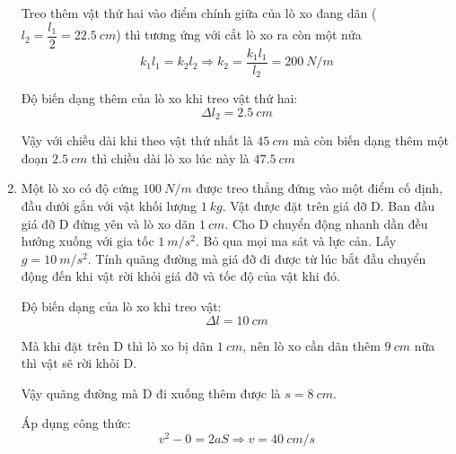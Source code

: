 \begin{enumerate}[label=\bfseries Câu \arabic*:]
{		Treo thêm vật thứ hai vào điểm chính giữa của lò xo đang dãn ($l_2 = \dfrac{l_1}{2} = \SI{22.5}{cm}$) thì tương ứng với cắt lò xo ra còn một nửa 
		$$k_1l_1= k_2 l_2 \Rightarrow k_2 = \dfrac{k_1l_1}{l_2} = \SI{200}{N/m}$$
		
		Độ biến dạng thêm của lò xo khi treo vật thứ hai:
		$$\Delta l_2 = \SI{2.5}{cm}$$
		
		Vậy với chiều dài khi theo vật thứ nhất là $\SI{45}{cm}$ mà còn biến dạng thêm một đoạn $\SI{2.5}{cm}$ thì chiều dài lò xo lúc này là $\SI{47.5}{cm}$
		
	}
	\item {}
	
	
	{
		Một lò xo có độ cứng $\SI{100}{N/m}$ được treo thẳng đứng vào một điểm cố định, đầu dưới gắn với vật khối lượng $\SI{1}{kg}$. Vật được đặt trên giá đỡ D. Ban đầu giá đỡ D đứng yên và lò xo dãn $\SI{1}{cm}$. Cho D chuyển động nhanh dần đều hướng xuống với gia tốc $\SI{1}{m/s^2}$. Bỏ qua mọi ma sát và lực cản. Lấy $g=\SI{10}{m/s^2}$. Tính quãng đường mà giá đỡ đi được từ lúc bắt đầu chuyển động đến khi vật rời khỏi giá đỡ và tốc độ của vật khi đó.
	}
	
	\hideall
	{	
		Độ biến dạng của lò xo khi treo vật:
		$$\Delta l = \SI{10}{cm}$$
		
		Mà khi đặt trên D thì lò xo bị dãn $\SI{1}{cm}$, nên lò xo cần dãn thêm $\SI{9}{cm}$ nữa thì vật sẽ rời khỏi D.
		
		Vậy quãng đường mà D đi xuống thêm được là $s=\SI{8}{cm}$.
		
		Áp dụng công thức:
		$$v^2 -0 = 2aS \Rightarrow v = \SI{40}{cm/s}$$
	}

\end{enumerate}